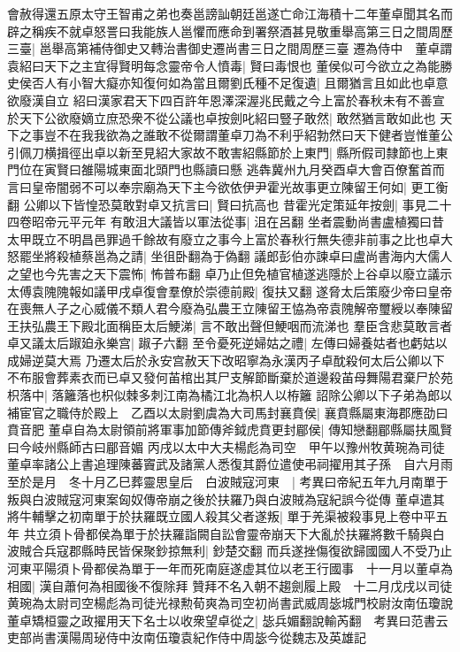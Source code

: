 會赦得還五原太守王智甫之弟也奏邕謗訕朝廷邕遂亡命江海積十二年董卓聞其名而辟之稱疾不就卓怒詈曰我能族人邕懼而應命到署祭酒甚見敬重舉高第三日之間周歷三臺|{
	邕舉高第補侍御史又轉治書御史遷尚書三日之間周歷三臺}
遷為侍中　董卓謂袁紹曰天下之主宜得賢明每念靈帝令人憤毒|{
	賢曰毒恨也}
董侯似可今欲立之為能勝史侯否人有小智大癡亦知復何如為當且爾劉氏種不足復遺|{
	且爾猶言且如此也卓意欲廢漢自立}
紹曰漢家君天下四百許年恩澤深渥兆民戴之今上富於春秋未有不善宣於天下公欲廢嫡立庶恐衆不從公議也卓按劍叱紹曰豎子敢然|{
	敢然猶言敢如此也}
天下之事豈不在我我欲為之誰敢不從爾謂董卓刀為不利乎紹勃然曰天下健者豈惟董公引佩刀横揖徑出卓以新至見紹大家故不敢害紹縣節於上東門|{
	縣所假司隸節也上東門位在寅賢曰雒陽城東面北頭門也縣讀曰懸}
逃犇冀州九月癸酉卓大會百僚奮首而言曰皇帝闇弱不可以奉宗廟為天下主今欲依伊尹霍光故事更立陳留王何如|{
	更工衡翻}
公卿以下皆惶恐莫敢對卓又抗言曰|{
	賢曰抗高也}
昔霍光定策延年按劍|{
	事見二十四卷昭帝元平元年}
有敢沮大議皆以軍法從事|{
	沮在呂翻}
坐者震動尚書盧植獨曰昔太甲既立不明昌邑罪過千餘故有廢立之事今上富於春秋行無失德非前事之比也卓大怒罷坐將殺植蔡邕為之請|{
	坐徂卧翻為于偽翻}
議郎彭伯亦諫卓曰盧尚書海内大儒人之望也今先害之天下震怖|{
	怖普布翻}
卓乃止但免植官植遂逃隱於上谷卓以廢立議示太傅袁隗隗報如議甲戌卓復會羣僚於崇德前殿|{
	復扶又翻}
遂脅太后策廢少帝曰皇帝在喪無人子之心威儀不類人君今廢為弘農王立陳留王恊為帝袁隗解帝璽綬以奉陳留王扶弘農王下殿北面稱臣太后鯁涕|{
	言不敢出聲但鯁咽而流涕也}
羣臣含悲莫敢言者卓又議太后踧廹永樂宫|{
	踧子六翻}
至令憂死逆婦姑之禮|{
	左傳曰婦養姑者也虧姑以成婦逆莫大焉}
乃遷太后於永安宫赦天下改昭寧為永漢丙子卓酖殺何太后公卿以下不布服會葬素衣而已卓又發何苖棺出其尸支解節斷棄於道邊殺苖母舞陽君棄尸於苑枳落中|{
	落籬落也枳似棘多刺江南為橘江北為枳人以栫籬}
詔除公卿以下子弟為郎以補宦官之職侍於殿上　乙酉以太尉劉虞為大司馬封襄賁侯|{
	襄賁縣屬東海郡應劭曰賁音肥}
董卓自為太尉領前將軍事加節傳斧鉞虎賁更封郿侯|{
	傳知戀翻郿縣屬扶風賢曰今岐州縣師古曰郿音媚}
丙戌以太中大夫楊彪為司空　甲午以豫州牧黄琬為司徒　董卓率諸公上書追理陳蕃竇武及諸黨人悉復其爵位遣使弔祠擢用其子孫　自六月雨至於是月　冬十月乙巳葬靈思皇后　白波賊寇河東　|{
	考異曰帝紀五年九月南單于叛與白波賊寇河東案匈奴傳帝崩之後於扶羅乃與白波賊為寇紀誤今從傳}
董卓遣其將牛輔擊之初南單于於扶羅既立國人殺其父者遂叛|{
	單于羌渠被殺事見上卷中平五年}
共立須卜骨都侯為單于於扶羅詣闕自訟會靈帝崩天下大亂於扶羅將數千騎與白波賊合兵寇郡縣時民皆保聚鈔掠無利|{
	鈔楚交翻}
而兵遂挫傷復欲歸國國人不受乃止河東平陽須卜骨都侯為單于一年而死南庭遂虚其位以老王行國事　十一月以董卓為相國|{
	漢自蕭何為相國後不復除拜}
贊拜不名入朝不趨劍履上殿　十二月戊戌以司徒黄琬為太尉司空楊彪為司徒光禄勲荀爽為司空初尚書武威周毖城門校尉汝南伍瓊說董卓矯桓靈之政擢用天下名士以收衆望卓從之|{
	毖兵媚翻說輸芮翻　考異曰范書云吏部尚書漢陽周珌侍中汝南伍瓊袁紀作侍中周毖今從魏志及英雄記}
